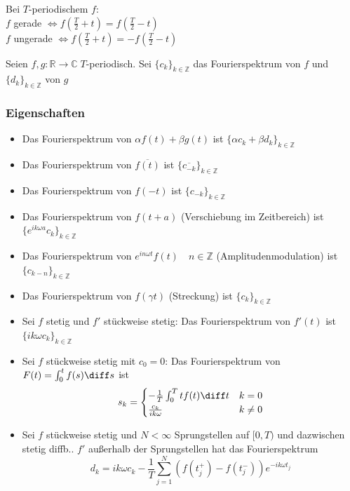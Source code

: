 \begin{sectionbox}
    Bei $T$-periodischem $f$: \\
    $f$ gerade $\Leftrightarrow f(\frac{T}{2}+t) = f(\frac{T}{2}-t)$ \\
    $f$ ungerade $\Leftrightarrow f(\frac{T}{2}+t) = -f(\frac{T}{2}-t)$

    Seien $f,g:\mathbb R \rightarrow\mathbb C \; T$-periodisch. Sei $\{c_k\}_{k\in\mathbb Z}$ das Fourierspektrum von $f$ und $\{d_k\}_{k\in\mathbb Z}$ von $g$
    \subsubsection{Eigenschaften}
    \begin{itemize}
        \item Das Fourierspektrum von $\alpha f(t) + \beta g(t)$ ist $\{\alpha c_k + \beta d_k\}_{k\in\mathbb Z}$
        \item Das Fourierspektrum von $\overline{f(t)}$ ist $\{\overline{c_{-k}}\}_{k\in\mathbb Z}$
        \item Das Fourierspektrum von $f(-t)$ ist $\{c_{-k}\}_{k\in\mathbb Z}$
        \item Das Fourierspektrum von $f(t + a)$ (Verschiebung im Zeitbereich) ist $\{e^{ik\omega a}c_k\}_{k\in\mathbb Z}$
        \item Das Fourierspektrum von $e^{in\omega t}f(t) \quad n\in\mathbb Z$ (Amplitudenmodulation) ist $\{c_{k-n}\}_{k\in\mathbb Z}$
        \item Das Fourierspektrum von $f(\gamma t)$ (Streckung) ist $\{c_k\}_{k\in\mathbb Z}$
        \item Sei $f$ stetig und $f'$ stückweise stetig: Das Fourierspektrum von $f'(t)$ ist $\{ik\omega c_k\}_{k\in\mathbb Z}$
        \item Sei $f$ stückweise stetig mit $c_0=0$: Das Fourierspektrum von $F(t)=\int_0^t f(s)\diff s$ ist
              \begin{equation*}
                  s_k=\begin{cases}
                      -\frac{1}{T}\int_0^Ttf(t)\diff t & k=0    \\
                      \frac{c_k}{ik\omega}             & k\ne 0
                  \end{cases}
              \end{equation*}
        \item Sei $f$ stückweise stetig und $N < \infty$ Sprungstellen auf $[0,T)$ und dazwischen stetig diffb.. $f'$ außerhalb der Sprungstellen hat das Fourierspektrum \begin{equation*}
                  d_k=ik\omega c_k-\frac{1}{T}\sum_{j=1}^{N}(f(t_j^+) - f(t_j^-))e^{-ik\omega t_j}
              \end{equation*}
    \end{itemize}


\end{sectionbox}
